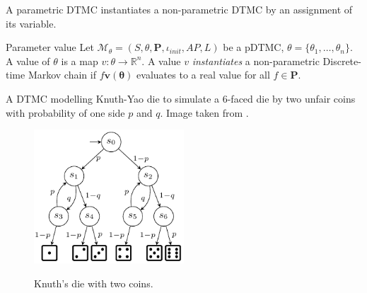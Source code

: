 A parametric DTMC instantiates a non-parametric DTMC by an assignment of its variable.
\begin{definition}{Parameter value}
      Let $\mathcal{M}_\theta = (S, \theta, \mathbf{P}, \iota_{init}, AP, L)$ be a pDTMC,
      $\theta=\{\theta_1,\ldots,\theta_n\}$. A value of $\theta$ is a map $v: \theta
            \rightarrow \mathbb{R}^n$. A value $v$ \textit{instantiates} a non-parametric
      Discrete-time Markov chain if $f{\mathbf{v(\theta)}}$ evaluates to a real value for all
      $f\in\mathbf{P}$.
\end{definition}
\begin{example}
      A DTMC modelling Knuth-Yao die to simulate a 6-faced die by two unfair coins with probability of
      one side $p$ and $q$. Image taken from \cite{katoen2016probabilistic}.
      \begin{figure}[H]
            \centering
            \includegraphics[width=0.5\textwidth]{figures/knuth_die_pq.png}
            \label{fig:knuth-die-pq}
            \caption{Knuth's die with two coins.}
      \end{figure}
\end{example}

